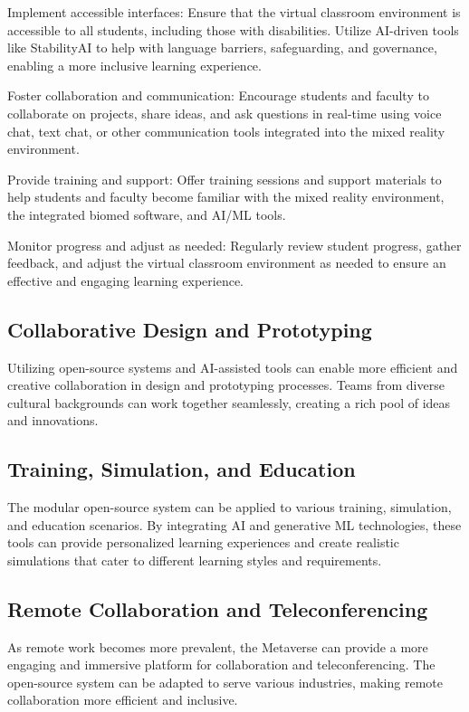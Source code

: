     Implement accessible interfaces: Ensure that the virtual classroom environment is accessible to all students, including those with disabilities. Utilize AI-driven tools like StabilityAI to help with language barriers, safeguarding, and governance, enabling a more inclusive learning experience.

    Foster collaboration and communication: Encourage students and faculty to collaborate on projects, share ideas, and ask questions in real-time using voice chat, text chat, or other communication tools integrated into the mixed reality environment.

    Provide training and support: Offer training sessions and support materials to help students and faculty become familiar with the mixed reality environment, the integrated biomed software, and AI/ML tools.

    Monitor progress and adjust as needed: Regularly review student progress, gather feedback, and adjust the virtual classroom environment as needed to ensure an effective and engaging learning experience.
\subsection{Collaborative Design and Prototyping}
Utilizing open-source systems and AI-assisted tools can enable more efficient and creative collaboration in design and prototyping processes. Teams from diverse cultural backgrounds can work together seamlessly, creating a rich pool of ideas and innovations.

\subsection{Training, Simulation, and Education}
The modular open-source system can be applied to various training, simulation, and education scenarios. By integrating AI and generative ML technologies, these tools can provide personalized learning experiences and create realistic simulations that cater to different learning styles and requirements.

\subsection{Remote Collaboration and Teleconferencing}
As remote work becomes more prevalent, the Metaverse can provide a more engaging and immersive platform for collaboration and teleconferencing. The open-source system can be adapted to serve various industries, making remote collaboration more efficient and inclusive.

